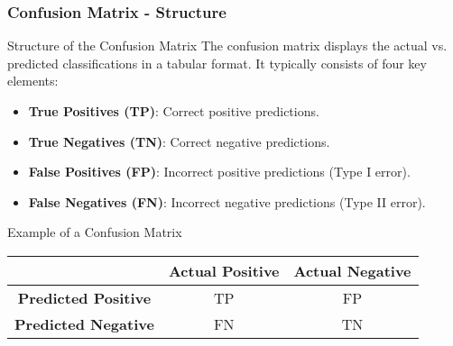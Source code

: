 \documentclass[aspectratio=169]{beamer}
\begin{document}
\begin{frame}[fragile]
    \frametitle{Confusion Matrix - Structure}
    \begin{block}{Structure of the Confusion Matrix}
        The confusion matrix displays the actual vs. predicted classifications in a tabular format. 
        It typically consists of four key elements:
        \begin{itemize}
            \item \textbf{True Positives (TP)}: Correct positive predictions.
            \item \textbf{True Negatives (TN)}: Correct negative predictions.
            \item \textbf{False Positives (FP)}: Incorrect positive predictions (Type I error).
            \item \textbf{False Negatives (FN)}: Incorrect negative predictions (Type II error).
        \end{itemize}
    \end{block}
    \begin{block}{Example of a Confusion Matrix}
        \begin{center}
            \begin{tabular}{|c|c|c|}
                \hline
                & \textbf{Actual Positive} & \textbf{Actual Negative} \\
                \hline
                \textbf{Predicted Positive} & TP & FP \\
                \hline
                \textbf{Predicted Negative} & FN & TN \\
                \hline
            \end{tabular}
        \end{center}
    \end{block}
\end{frame}
\end{document}
